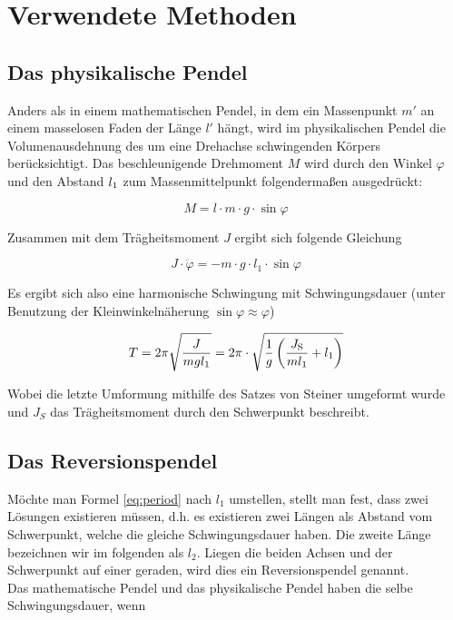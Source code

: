 \section{Verwendete Methoden}
\subsection{Das physikalische Pendel}
Anders als in einem mathematischen Pendel, in dem ein Massenpunkt $m'$ an einem masselosen Faden der Länge $l'$ hängt, wird im physikalischen Pendel die Volumenausdehnung des um eine Drehachse schwingenden Körpers berücksichtigt. Das beschleunigende Drehmoment $M$ wird durch den Winkel $\varphi$ und den Abstand $l_{\mathrm{1}}$ zum Massenmittelpunkt folgendermaßen ausgedrückt:

\begin{equation*}
M = l \cdot m \cdot g \cdot \sin \varphi
\end{equation*}

Zusammen mit dem Trägheitsmoment $J$ ergibt sich folgende Gleichung

\begin{equation}
J \cdot \ddot{\varphi} = - m \cdot g \cdot l_1 \cdot \sin \varphi
\label{eq:basis}
\end{equation}

Es ergibt sich also eine harmonische Schwingung mit Schwingungsdauer (unter Benutzung der Kleinwinkelnäherung $\sin \varphi \approx \varphi$)

\begin{equation}
T = 2\pi \sqrt{\frac{J}{mgl_1}} = 2\pi \cdot  \sqrt{\frac{1}{g}\left(\frac{J_{\mathrm{S}}}{ml_1}+l_1\right)}
\label{eq:period}
\end{equation}

Wobei die letzte Umformung mithilfe des Satzes von Steiner umgeformt wurde und $J_S$ das Trägheitsmoment durch den Schwerpunkt beschreibt.

\subsection{Das Reversionspendel}
Möchte man Formel \ref{eq:period} nach $l_1$ umstellen, stellt man fest, dass zwei Lösungen existieren müssen, d.h. es existieren zwei Längen als Abstand vom Schwerpunkt, welche die gleiche Schwingungsdauer haben. Die zweite Länge bezeichnen wir im folgenden als $l_2$. Liegen die beiden Achsen und der Schwerpunkt auf einer geraden, wird dies ein Reversionspendel genannt.\\
Das mathematische Pendel und das physikalische Pendel haben die selbe Schwingungsdauer, wenn 

